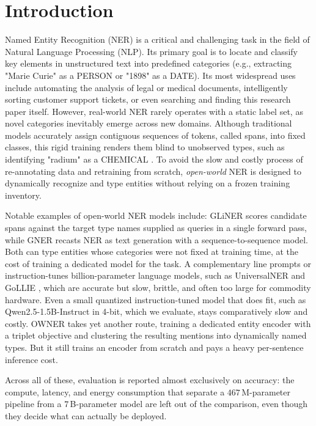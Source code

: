 \section{Introduction}
\label{sec:introduction}

Named Entity Recognition (NER) is a critical and challenging task in the field of Natural Language
Processing (NLP). Its primary goal is to locate and classify key elements in unstructured text into predefined categories (e.g., extracting "Marie Curie" as a PERSON or "1898" as a DATE). Its most widespread uses include automating the analysis of legal or medical documents, intelligently sorting customer support tickets, or even searching and finding this research paper itself. However, real-world NER rarely operates with a static label set, as novel categories inevitably emerge across new domains. Although traditional models accurately assign contiguous sequences of tokens, called spans, into fixed classes, this rigid training renders them blind to unobserved types, such as identifying "radium" as a CHEMICAL \cite{nguyen2023span}.
To avoid the slow and costly process of re-annotating data and retraining from scratch, \emph{open-world} NER is designed to dynamically recognize and type entities without relying on a frozen training inventory.

Notable examples of open-world NER models include: GLiNER \cite{zaratiana2024gliner} scores candidate spans against the target type names supplied as queries in a single forward pass, while GNER \cite{ding2024gner} recasts NER as text generation with a sequence-to-sequence model. Both can type entities whose categories were not fixed at training time, at the cost of training a dedicated model for the task.
A complementary line prompts or instruction-tunes billion-parameter language models, such as UniversalNER \cite{zhou2024universalner} and GoLLIE \cite{sainz2024gollie}, which are accurate but slow, brittle, and often too large for commodity hardware. Even a small quantized instruction-tuned model that does fit, such as Qwen2.5-1.5B-Instruct \cite{qwen2025} in 4-bit, which we evaluate, stays comparatively slow and costly.
OWNER \cite{genest2025owner} takes yet another route, training a dedicated entity encoder with a triplet objective and clustering the resulting mentions into dynamically named types. But it still trains an encoder from scratch and pays a heavy per-sentence inference cost.

Across all of these, evaluation is reported almost exclusively on accuracy: the compute, latency, and energy consumption that separate a $467$\,M-parameter pipeline from a $7$\,B-parameter model are left out of the comparison, even though they decide what can actually be deployed.

